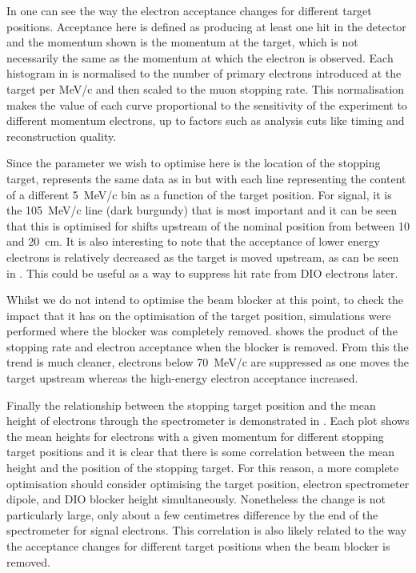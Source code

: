\FigOptimStopTgtPosSensitivitySpect
In  one can see the way the electron acceptance changes for different target positions.
Acceptance here is defined as producing at least one hit in the detector and the momentum shown is the momentum at the target, which is not necessarily the same as the momentum at which the electron is observed.
Each histogram in  is normalised to the number of primary electrons introduced at the target per MeV/c and then scaled to the muon stopping rate.
This normalisation makes the value of each curve proportional to the sensitivity of the experiment to different momentum electrons, up to factors such as analysis cuts like timing and reconstruction quality.

\FigOptimStopTgtPosSensitivityIntegral
Since the parameter we wish to optimise here is the location of the stopping target,  represents the same data as in  but with each line representing the content of a different 5~MeV/c bin as a function of the target position.
For signal, it is the 105~MeV/c line (dark burgundy) that is most important and it can be seen that this is optimised for shifts upstream of the nominal position from between 10 and 20~cm.
It is also interesting to note that the acceptance of lower energy electrons is relatively decreased as the target is moved upstream, as can be seen in .
This could be useful as a way to suppress hit rate from DIO electrons later.

Whilst we do not intend to optimise the beam blocker at this point, to check the impact that it has on the optimisation of the target position, simulations were performed where the blocker was completely removed.
 shows the product of the stopping rate and electron acceptance when the blocker is removed.
From this the trend is much cleaner, electrons below 70~MeV/c are suppressed as one moves the target upstream whereas the high-energy electron acceptance increased.
\FigOptimStopTgtPosSensitivityNoBeamBlock


\FigOptimStopTgtPosHeights
Finally the relationship between the stopping target position and the mean height of electrons through the spectrometer is demonstrated in .
Each plot shows the mean heights for electrons with a given momentum for different stopping target positions and it is clear that there is some correlation between the mean height and the position of the stopping target.
For this reason, a more complete optimisation should consider optimising the target position, electron spectrometer dipole, and DIO blocker height simultaneously.
Nonetheless the change is not particularly large, only about a few centimetres difference by the end of the spectrometer for signal electrons.
This correlation is also likely related to the way the acceptance changes for different target positions when the beam blocker is removed.

